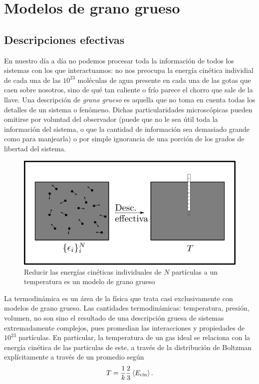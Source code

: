 \section{Modelos de grano grueso}\label{sec:Ch1CG}

\subsection{Descripciones efectivas}

En nuestro día a día no podemos procesar toda la información de todos los sistemas con los que interactuamos: no nos preocupa la energía cinética individial de cada una de las $10^{23}$ moléculas de agua presente en cada una de las gotas que caen sobre nosotros, sino de qué tan caliente o frío parece el chorro que sale de la llave. Una descripción de \textit{grano grueso} es aquella que no toma en cuenta todas los detalles de un sistema o fenómeno. Dichas particularidades microscópicas pueden omitirse por voluntad del observador (puede que no le sea útil toda la información del sistema, o que la cantidad de información sea demasiado grande como para manjearla) o por simple ignorancia de una porción de los grados de libertad del sistema.

\begin{figure}[ht]
    \centering
    \includegraphics[width=0.6\linewidth]{chapter1/figures/CGT.png}
    \caption{Reducir las energías cinéticas individuales de $N$ partículas a un temperatura es un modelo de grano grueso}
    \label{fig:KtoT}
\end{figure}


La termodinámica es un área de la física que trata casi exclusivamente con modelos de grano grueso. Las cantidades termodinámicas: temperatura, presión, volumen, no son sino el resultado de una descripción gruesa de sistemas extremadamente complejos, pues promedian las interacciones y propiedades de $10^{23}$ partículas. En particular, la temperatura de un gas ideal se relaciona con la energía cinética de las particulas de este, a través de la distribución de Boltzman explícitamente a través de un promedio según
\begin{equation}
    T=\frac{1}{k}\frac{2}{3}\expval{E_{\text{cin}}}.
\end{equation}

